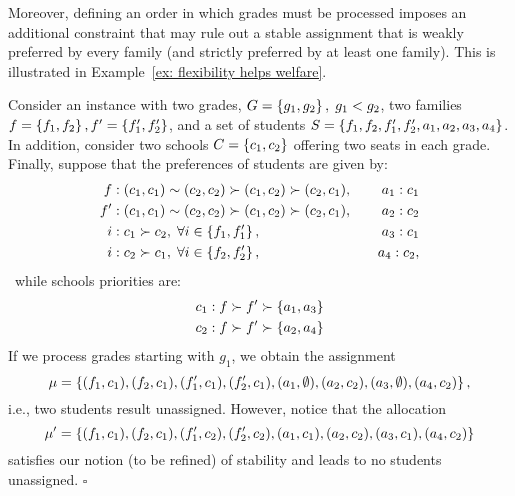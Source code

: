    Moreover, defining an order in which grades must be processed imposes an additional constraint that may rule out a stable assignment that is weakly preferred by every family (and strictly preferred by at least one family). This is illustrated in Example~\ref{ex: flexibility helps welfare}.
    \begin{example}\label{ex: flexibility helps welfare}
        Consider an instance with two grades, \(G = \left\{g_1, g_2\right\}, \; g_1 < g_2\), two families \(f = \left\{f_1, f_2\right\}, f' = \left\{f'_1, f'_2\right\}\), and a set of students \(S = \left\{f_1, f_2, f_1', f_2', a_1, a_2, a_3, a_4\right\}\).
        In addition, consider two schools \(C = \left\{c_1, c_2\right\}\) offering two seats in each grade. Finally, suppose that the preferences of students are given by:
        \begin{equation}
          \begin{aligned}
            f&: (c_1, c_1) \sim (c_2, c_2) \succ (c_1, c_2) \succ (c_2, c_1) ,  & \quad a_1: c_1 \\
            f'&: (c_1, c_1) \sim (c_2, c_2) \succ (c_1, c_2) \succ (c_2, c_1),  & \quad a_2: c_2 \\
            i&: c_1 \succ c_2, \; \forall i \in \left\{f_1, f_1'\right\}, & \quad a_3: c_1 \\
            i&: c_2 \succ c_1, \; \forall i \in \left\{f_2, f_2'\right\},  & \quad a_4: c_2, \\
          \end{aligned}
        \end{equation}\
        while schools priorities are:
        \begin{equation}
          \begin{aligned}
            c_1&: f \succ f' \succ \left\{a_1,a_3\right\} \\
            c_2&: f \succ f' \succ \left\{a_2,a_4\right\}
          \end{aligned}
        \end{equation}
        If we process grades starting with \(g_1\), we obtain the assignment
        \[\mu = \left\{(f_1,c_1), (f_2,c_1), (f'_1,c_1), (f'_2,c_1), (a_1, \emptyset), (a_2, c_2), (a_3, \emptyset), (a_4, c_2)\right\},\]
        i.e., two students result unassigned. However, notice that the allocation
        \[\mu' = \left\{(f_1,c_1), (f_2,c_1), (f'_1,c_2), (f'_2,c_2), (a_1, c_1), (a_2, c_2), (a_3, c_1), (a_4, c_2)\right\}\]
        satisfies our notion (to be refined) of stability and leads to no students unassigned.
        \hfill \(\square\)
    \end{example}

